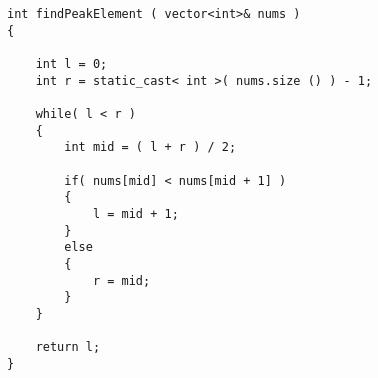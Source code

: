\setcounter{lstlisting}{0}
\begin{lstlisting}[style=customc, caption={Reference Code}]
int findPeakElement ( vector<int>& nums )
{

	int l = 0;
	int r = static_cast< int >( nums.size () ) - 1;

	while( l < r )
	{
		int mid = ( l + r ) / 2;

		if( nums[mid] < nums[mid + 1] )
		{
			l = mid + 1;
		}
		else
		{
			r = mid;
		}
	}

	return l;
}
\end{lstlisting}